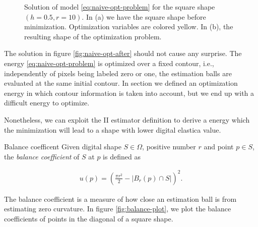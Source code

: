 \begin{figure}
\caption{Solution of model \eqref{eq:naive-opt-problem} for the square shape $(h=0.5,r=10)$. In (a) we have the square shape before minimization. Optimization variables are colored yellow. In (b), the resulting shape of the optimization problem. }
\label{fig:naive-opt-problem}
\end{figure}

The solution in figure \ref{fig:naive-opt-after} should not cause any surprise. The energy \eqref{eq:naive-opt-problem} is optimized over a fixed contour, i.e., independently of pixels being labeled zero or one, the estimation balls are evaluated at the same initial contour. In section \label{sec:global-optimization-model} we defined an optimization energy in which contour information is taken into account, but we end up with a difficult energy to optimize.

Nonetheless, we can exploit the II estimator definition to derive a energy which the minimization will lead to a shape with lower digital elastica value.


\begin{definition}{Balance coefficent}
Given digital shape $S \in \Omega$, positive number $r$ and point $p \in S$, the \emph{balance coefficient} of $S$ at $p$ is defined as

\begin{align*}
	u(p) = \left( \frac{\pi r^2}{2} - |B_r(p) \cap S| \right)^2.
\end{align*}

\end{definition}

The balance coefficient is a measure of how close an estimation ball is from estimating zero curvature. In figure \ref{fig:balance-plot}, we plot the balance coefficients of points in the diagonal of a square shape. 

